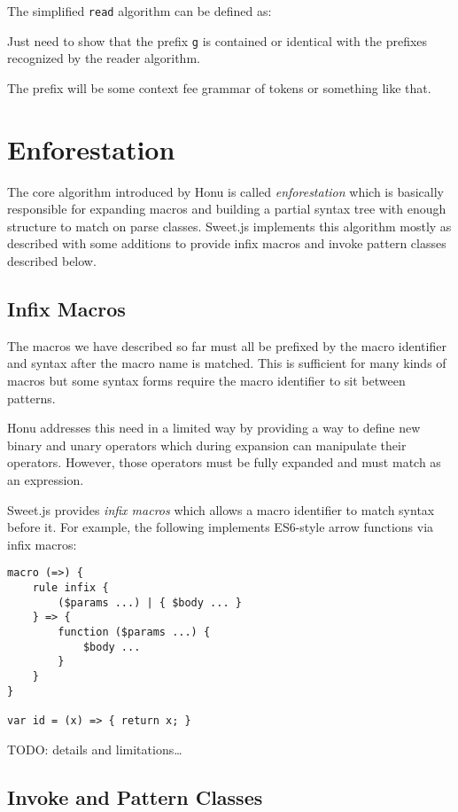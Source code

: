\documentclass[preprint,10pt]{sigplanconf}
\begin{document}
The simplified \texttt{read} algorithm can be defined as:

Just need to show that the prefix \texttt{g} is contained or identical with
the prefixes recognized by the reader algorithm.

The prefix will be some context fee grammar of tokens or something
like that.

\section{Enforestation}
\label{sec-3}

The core algorithm introduced by Honu is called \emph{enforestation} which
is basically responsible for expanding macros and building a partial
syntax tree with enough structure to match on parse classes. Sweet.js
implements this algorithm mostly as described with some additions to
provide infix macros and invoke pattern classes described below.

\subsection{Infix Macros}
\label{sec-3-1}
The macros we have described so far must all be prefixed by the macro
identifier and syntax after the macro name is matched. This is
sufficient for many kinds of macros but some syntax forms require the
macro identifier to sit between patterns.

Honu addresses this need in a limited way by providing a way to define
new binary and unary operators which during expansion can manipulate
their operators. However, those operators must be fully expanded and
must match as an expression.

Sweet.js provides \emph{infix macros} which allows a macro identifier to
match syntax before it. For example, the following implements
ES6-style arrow functions via infix macros:

\begin{verbatim}
macro (=>) {
    rule infix {
        ($params ...) | { $body ... }
    } => {
        function ($params ...) {
            $body ...
        }
    }
}

var id = (x) => { return x; }
\end{verbatim}

TODO: details and limitations\ldots{}
\subsection{Invoke and Pattern Classes}
\label{sec-3-2}
\end{document}
